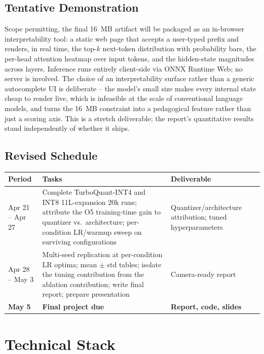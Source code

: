 \documentclass[11pt, letterpaper]{article}
\begin{document}
\subsection{Tentative Demonstration}

Scope permitting, the final 16~MB artifact will be packaged
as an in-browser interpretability tool: a static web page that
accepts a user-typed prefix and renders, in real time, the
top-$k$ next-token distribution with probability bars, the
per-head attention heatmap over input tokens, and the
hidden-state magnitudes across layers. Inference runs entirely
client-side via ONNX Runtime Web; no server is involved.
The choice of an interpretability surface rather than a generic
autocomplete UI is deliberate -- the model's small size makes
every internal state cheap to render live, which is infeasible
at the scale of conventional language models, and turns the
16~MB constraint into a pedagogical feature rather than just a
scoring axis. This is a stretch deliverable; the report's
quantitative results stand independently of whether it ships.

\subsection{Revised Schedule}

\begin{longtable}{@{}p{2.8cm} p{9cm} p{2.8cm}@{}}
\toprule
\textbf{Period} & \textbf{Tasks} & \textbf{Deliverable} \\
\midrule
\endfirsthead
Apr 21 -- Apr 27 &
Complete TurboQuant-INT4 and INT8 11L-expansion 20k runs;
attribute the O5 training-time gain to quantizer vs.\
architecture; per-condition LR/warmup sweep on surviving
configurations &
Quantizer/architecture attribution; tuned hyperparameters \\[4pt]
Apr 28 -- May 3 &
Multi-seed replication at per-condition LR optima;
mean $\pm$ std tables; isolate the tuning contribution
from the ablation contribution; write final report;
prepare presentation &
Camera-ready report \\[4pt]
\textbf{May 5} &
\textbf{Final project due} &
\textbf{Report, code, slides} \\
\bottomrule
\end{longtable}

\section{Technical Stack}
\end{document}
